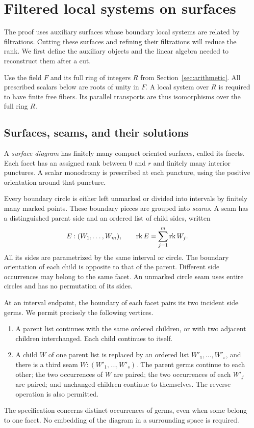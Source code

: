 \section{Filtered local systems on surfaces}
\label{sec:diagrams}

The proof uses auxiliary surfaces whose boundary local systems are related
by filtrations.  Cutting these surfaces and refining their filtrations
will reduce the rank.  We first define the auxiliary objects and the
linear algebra needed to reconstruct them after a cut.

Use the field $F$ and its full ring of integers $R$ from
Section~\ref{sec:arithmetic}.  All prescribed
scalars below are roots of unity in $F$.  A local system over $R$ is
required to have finite free fibers.  Its parallel transports are thus
isomorphisms over the full ring $R$.

\subsection{Surfaces, seams, and their solutions}

A \emph{surface diagram} has finitely many compact oriented surfaces,
called its facets.  Each facet has an assigned rank between $0$ and $r$
and finitely many interior punctures.  A scalar monodromy is prescribed
at each puncture, using the positive orientation around that puncture.

Every boundary circle is either left unmarked or divided into intervals
by finitely many marked points.  These boundary pieces are grouped into
\emph{seams}.  A seam has a distinguished parent side and an ordered
list of child sides, written
\[
 E:(W_1,\ldots,W_m),\qquad
 \operatorname{rk} E=\sum_{j=1}^m\operatorname{rk} W_j.
\]
All its sides are parametrized by the same interval or circle.  The
boundary orientation of each child is opposite to that of the parent.
Different side occurrences may belong to the same facet.  An unmarked
circle seam uses entire circles and has no permutation of its sides.

At an interval endpoint, the boundary of each facet pairs its two
incident side germs.  We permit precisely the following vertices.
\begin{enumerate}
\item A parent list continues with the same ordered children, or with
two adjacent children interchanged.  Each child continues to itself.
\item A child $W$ of one parent list is replaced by an ordered list
$W'_1,\ldots,W'_s$, and there is a third seam
$W:(W'_1,\ldots,W'_s)$.  The parent germs continue to each other;
the two occurrences of $W$ are paired; the two occurrences of each
$W'_j$ are paired; and unchanged children continue to themselves.
The reverse operation is also permitted.
\end{enumerate}
The specification concerns distinct occurrences of germs, even when
some belong to one facet.  No embedding of the diagram in a surrounding
space is required.

